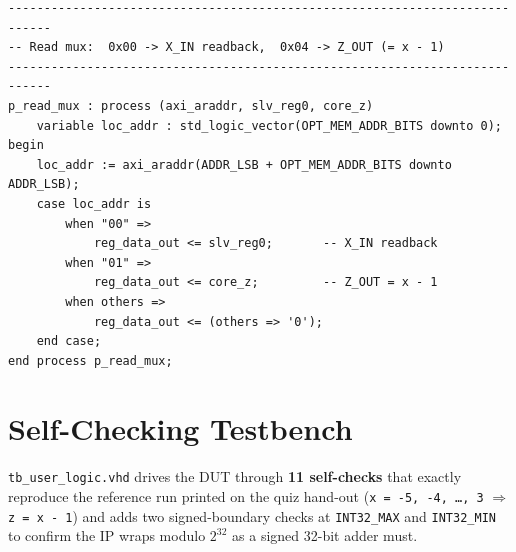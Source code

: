 \documentclass[11pt,letterpaper]{article}
\begin{document}
\begin{lstlisting}[caption={\texttt{add\_const\_axi\_v1\_0\_S00\_AXI.vhd} --
                   user\_logic component declaration, instantiation, and
                   read mux},label={lst:slv}]
----------------------------------------------------------------------------
-- Read mux:  0x00 -> X_IN readback,  0x04 -> Z_OUT (= x - 1)
----------------------------------------------------------------------------
p_read_mux : process (axi_araddr, slv_reg0, core_z)
    variable loc_addr : std_logic_vector(OPT_MEM_ADDR_BITS downto 0);
begin
    loc_addr := axi_araddr(ADDR_LSB + OPT_MEM_ADDR_BITS downto ADDR_LSB);
    case loc_addr is
        when "00" =>
            reg_data_out <= slv_reg0;       -- X_IN readback
        when "01" =>
            reg_data_out <= core_z;         -- Z_OUT = x - 1
        when others =>
            reg_data_out <= (others => '0');
    end case;
end process p_read_mux;
\end{lstlisting}

\section{Self-Checking Testbench}

\texttt{tb\_user\_logic.vhd} drives the DUT through \textbf{11 self-checks}
that exactly reproduce the reference run printed on the quiz hand-out
(\texttt{x = -5, -4, \ldots, 3} $\Rightarrow$ \texttt{z = x - 1}) and adds
two signed-boundary checks at \texttt{INT32\_MAX} and \texttt{INT32\_MIN}
to confirm the IP wraps modulo $2^{32}$ as a signed 32-bit adder must.
\end{document}
